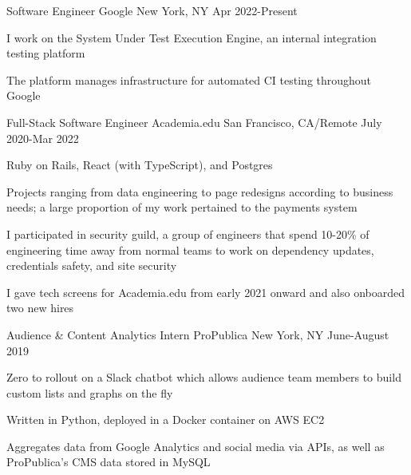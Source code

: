 

\begin{cventries}

  \cventry
    {Software Engineer}
    {Google}
    {New York, NY}
    {Apr 2022-Present}
    {
      \begin{cvitems}
        \item {
          I work on the System Under Test Execution Engine, an internal integration testing
          platform
        }
        \item {
          The platform manages infrastructure for automated CI testing throughout Google
        }
      \end{cvitems}
    }

  \cventry
    {Full-Stack Software Engineer}
    {Academia.edu}
    {San Francisco, CA/Remote}
    {July 2020-Mar 2022}
    {
      \begin{cvitems}
        \item {Ruby on Rails, React (with TypeScript), and Postgres}
        \item {
          Projects ranging from data engineering to page redesigns according to
          business needs; a large proportion of my work pertained to the
          payments system
        }
        \item {
          I participated in security guild, a group of engineers that spend 10-20\% of
          engineering time away from normal teams to work on dependency updates,
          credentials safety, and site security
        }
        \item {
          I gave tech screens for Academia.edu from early 2021 onward and also
          onboarded two new hires
        }
      \end{cvitems}
    }

  \cventry
    {Audience \& Content Analytics Intern}
    {ProPublica}
    {New York, NY}
    {June-August 2019}
    {
      \begin{cvitems}
        \item {
          Zero to rollout on a Slack chatbot which allows audience team
          members to build custom lists and graphs on the fly
        }
        \item {
          Written in Python, deployed in a Docker container on AWS EC2
        }
        \item {
          Aggregates data from Google Analytics and social media via APIs, as well
          as ProPublica's CMS data stored in MySQL
        }
      \end{cvitems}
    }

\end{cventries}

